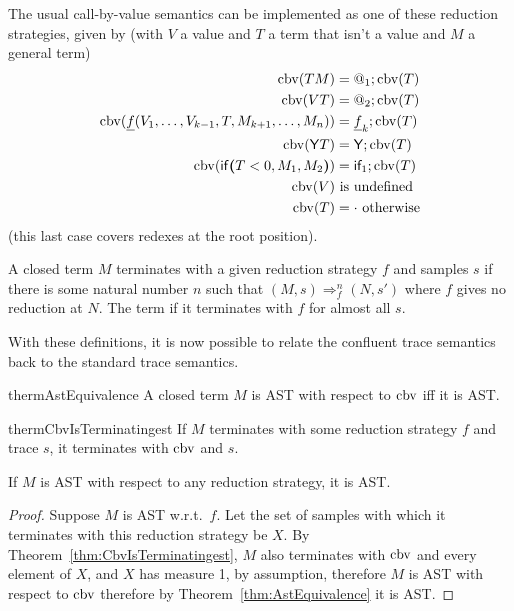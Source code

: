 The usual call-by-value semantics can be implemented as one of these reduction strategies, given by (with $V$ a value and $T$ a term that isn't a value and $M$ a general term)
\begin{align*}
\operatorname{cbv}(T M) & = @_1 ; \operatorname{cbv}(T) \\
\operatorname{cbv}(V T) & = @_2 ; \operatorname{cbv}(T) \\
\operatorname{cbv}(\underline f(V_1, \dots, V_{k-1}, T, M_{k+1}, \dots, M_n)) & = \underline f_k ; \operatorname{cbv}(T) \\
\operatorname{cbv}(\mathsf{Y} T) & = \mathsf{Y} ; \operatorname{cbv}(T) \\
\operatorname{cbv}(\mathsf{if}\boldsymbol{(}T < 0, M_1, M_2\boldsymbol{)}) & = \textsf{if}_1 ; \operatorname{cbv}(T) \\
\operatorname{cbv}(V) & \text{ is undefined} \\
\operatorname{cbv}(T) & = \cdot \text{ otherwise}
\end{align*}
(this last case covers redexes at the root position).

A closed term $M$ terminates with a given reduction strategy $f$ and samples $s$ if there is some natural number $n$ such that $(M,s) \Rightarrow_f^n (N,s')$ where $f$ gives no reduction at $N$. 
The term  if it terminates with $f$ for almost all $s$.

With these definitions, it is now possible to relate the confluent trace semantics back to the standard trace semantics.

\begin{restatable}{therm}{AstEquivalence} \label{thm:AstEquivalence}
A closed term $M$ is AST with respect to $\operatorname{cbv}$ iff it is AST.
\end{restatable}

\begin{restatable}{therm}{CbvIsTerminatingest} \label{thm:CbvIsTerminatingest}
If $M$ terminates with some reduction strategy $f$ and trace $s$, it terminates with $\operatorname{cbv}$ and $s$.
\end{restatable}

\begin{corollary}
\label{cor:Reduction strategy independence}
If $M$ is AST with respect to any reduction strategy, it is AST.
\end{corollary}
\begin{proof}
Suppose $M$ is AST w.r.t.~$f$. Let the set of samples with which it terminates with this reduction strategy be $X$. By Theorem~\ref{thm:CbvIsTerminatingest}, $M$ also terminates with $\operatorname{cbv}$ and every element of $X$, and $X$ has measure 1, by assumption, therefore $M$ is AST with respect to $\operatorname{cbv}$ therefore by Theorem~\ref{thm:AstEquivalence} it is AST.
\end{proof}

